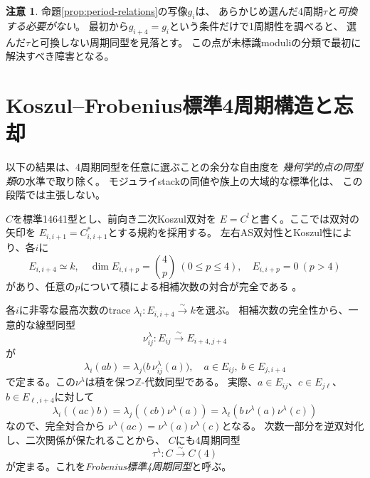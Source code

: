 \documentclass[11pt,a4paper]{ltjsarticle}
\theoremstyle{definition}
\newtheorem{remark}[theorem]{注意}
\begin{document}
\begin{remark}
命題\ref{prop:period-relations}の写像$g_i$は、
あらかじめ選んだ4周期$\tau$と\emph{可換する必要がない}。
最初から$g_{i+4}=g_i$という条件だけで1周期性を調べると、
選んだ$\tau$と可換しない周期同型を見落とす。
この点が未標識moduliの分類で最初に解決すべき障害となる。
\end{remark}


\section{Koszul--Frobenius標準4周期構造と忘却}\label{sec:canonical-four}
以下の結果は、4周期同型を任意に選ぶことの余分な自由度を
\emph{幾何学的点の同型類}の水準で取り除く。
モジュライstackの同値や族上の大域的な標準化は、
この段階では主張しない。

$C$を標準14641型とし、前向き二次Koszul双対を
$E=C^!$と書く。ここでは双対の矢印を
$E_{i,i+1}=C_{i,i+1}^{*}$とする規約を採用する。
左右AS双対性とKoszul性により、各$i$に
\[
 E_{i,i+4}\simeq k,\quad
 \dim E_{i,i+p}={4\choose p}\ (0\le p\le4),
 \quad E_{i,i+p}=0\ (p>4)
\]
があり、任意の$p$について積による相補次数の対合が完全である
\cite{BP}。

各$i$に非零な最高次数のtrace
$\lambda_i:E_{i,i+4}\xrightarrow{\sim}k$を選ぶ。
相補次数の完全性から、一意的な線型同型
\[
 \nu^\lambda_{ij}:E_{ij}\xrightarrow{\sim}E_{i+4,j+4}
\]
が
\begin{equation}\label{eq:nakayama-pair}
 \lambda_i(ab)=\lambda_j\bigl(b\,\nu^\lambda_{ij}(a)\bigr),
 \quad a\in E_{ij},\ b\in E_{j,i+4}
\end{equation}
で定まる。この$\nu^\lambda$は積を保つ$\mathbb Z$-代数同型である。
実際、$a\in E_{ij}$、$c\in E_{j\ell}$、$b\in E_{\ell,i+4}$に対して
\[
 \lambda_i((ac)b)
 =\lambda_j((cb)\nu^\lambda(a))
 =\lambda_\ell(b\,\nu^\lambda(a)\nu^\lambda(c))
\]
なので、完全対合から
$\nu^\lambda(ac)=\nu^\lambda(a)\nu^\lambda(c)$となる。
次数一部分を逆双対化し、二次関係が保たれることから、
$C$にも4周期同型
\[
 \tau^\lambda:C\xrightarrow{\sim}C(4)
\]
が定まる。これを\emph{Frobenius標準4周期同型}と呼ぶ。
\end{document}
